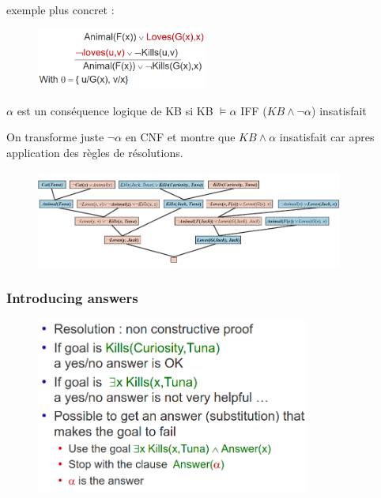 \documentclass[12pt]{article}
\begin{document}
			exemple plus concret :
			
			\begin{figure}[htp]	
				\centering
				\includegraphics[width=0.5\textwidth]{img/RIR.png}
			\end{figure}	
			
			$\alpha$ est un conséquence logique de KB si KB $\models \alpha$ IFF ($KB \land \neg \alpha$) insatisfait
			
			On transforme juste $\neg \alpha$ en CNF et montre que $KB \land \alpha$ insatisfait car apres application des règles de résolutions.
			
			\begin{figure}[htp]	
				\centering
				\includegraphics[width=0.9\textwidth]{img/RIR1.png}
			\end{figure}
			
		\subsubsection{Introducing answers}
		
			\begin{figure}[htp]	
				\centering
				\includegraphics[width=0.8\textwidth]{img/RIR2.png}
			\end{figure}
			
\end{document}
